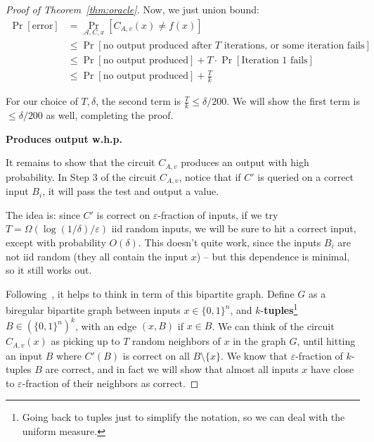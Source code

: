 \documentclass[]{article}
\newcommand{\1}{\mathbb{1}}
\renewcommand{\epsilon}{\varepsilon}
\newcommand{\eps}{\epsilon}
\newcommand{\A}{\mathcal{A}}
\begin{document}
\begin{proof}[Proof of Theorem~\ref{thm:oracle}]


Now, we just union bound:
\begin{align*}
    \Pr[\text{error}] &= \Pr_{\A, C, x}[C_{A, v}(x) \neq f(x)]\\
    &\leq
    \Pr[\text{no output produced after $T$ iterations, or some iteration fails}]\\
    &\leq
    \Pr[\text{no output produced}] + T \cdot \Pr[\text{Iteration 1 fails}]\\
    &\leq
    \Pr[\text{no output produced}] + \frac{T}{k}
\end{align*}

For our choice of $T, \delta$, the second term is $\frac{T}{k} \leq \delta /
200$. We will show the first term is $\leq \delta / 200$ as well, completing the
proof.

{\bf Produces output w.h.p.}

It remains to show that the circuit $C_{A, v}$ produces an output with high
probability.
In Step 3 of the circuit $C_{A, v}$, notice that if $C'$ is queried
on a correct input $B_i$, it will pass the test and output a value.

The idea is: since $C'$ is correct on $\epsilon$-fraction of inputs,
if we try $T = \Omega(\log(1/\delta)/\epsilon)$ iid random inputs,
we will be sure to hit a correct input, except with probability $O(\delta)$.
This doesn't quite work, since the inputs $B_i$ are not iid random (they all
contain the input $x$) -- but this dependence is minimal, so it still works
out.

Following~\cite{IJKW}, it helps to think in term of this bipartite graph.
Define $G$ as a biregular bipartite graph between inputs $x \in \{0, 1\}^n$,
and $k$-{\bf tuples}\footnote{Going back to tuples just to simplify
the notation, so we can deal with the uniform measure.}
$B \in (\{0, 1\}^n)^k$, with an edge
$(x, B)$ if $x \in B$.
We can think of the circuit $C_{A, v}(x)$ as picking up to $T$ random neighbors of $x$ in the graph
$G$, until hitting an input $B$ where $C'(B)$ is correct on all $B \setminus \{x\}$.
We know that $\epsilon$-fraction of $k$-tuples $B$ are correct, and in fact we will
show that almost all inputs $x$ have close to $\eps$-fraction of their neighbors
as correct.


\end{proof}
\end{document}
